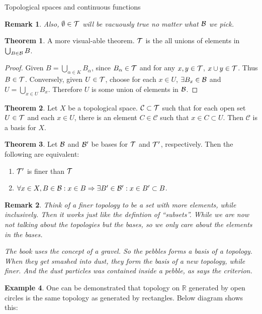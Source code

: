 \documentclass{report}
\newtheorem*{remark}{Remark}
\theoremstyle{definition}
\newtheorem{theorem}{Theorem}[chapter]
\newtheorem{example}[theorem]{Example}
\newcommand{\RA}{\ensuremath\Rightarrow}
\newcommand{\RR}{\mathbb{R}}
\newcommand{\ex}{\ensuremath\exists}
\begin{document}
\begin{chapter}{Topological spaces and continuous functions}
\begin{remark}
    Also, $\emptyset\in\mathcal{T}$ will be vacuously true no matter what $\mathcal{B}$
    we pick.
  \end{remark}
  \begin{theorem}
    A more visual-able theorem. $\mathcal{T}$ is the all unions of elements in
    $\bigcup_{B\in\mathcal{B}} B$.
  \end{theorem}
  \begin{proof}
    Given $B=\bigcup_{\alpha\in K} B_\alpha$, since $B_\alpha\in\mathcal{T}$
    and for any $x,y\in\mathcal{T}$, $x\cup y\in\mathcal{T}$. Thus $B\in\mathcal{T}$. Conversely,
    given $U\in\mathcal{T}$, choose for each $x\in U$, $\ex B_x\in\B$ and
    $U=\bigcup_{x\in U} B_x$. Therefore $U$ is some union of elements
    in $\mathcal{B}$.
  \end{proof}
  \begin{theorem}
    Let $X$ be a topological space. $\mathcal{C}\subset \mathcal{T}$ such that
    for each open set $U\in\mathcal{T}$ and each $x\in U$, there is an element
    $C\in\mathcal{C}$ such that $x\in C\subset U$. Then $\mathcal{C}$
    is a basis for $X$.
  \end{theorem}
  \begin{theorem}
    Let $\mathcal{B}$ and $\mathcal{B}'$ be bases for $\mathcal{T}$ and $\mathcal{T}'$, respectively. Then
    the following are equivalent:
    \begin{enumerate}
    \item $\mathcal{T}'$ is finer than $\mathcal{T}$
    \item
      $\forall x\in X, B\in\B : x\in B \RA \exists B'\in\B' : x\in B'
      \subset B$.
    \end{enumerate}
  \end{theorem}
  \begin{remark}
    Think of a finer topology to be a set with more elements, while
    inclusively. Then it works just like the defintion of
    ``subsets''. While we are now not talking about the topologies but
    the bases, so we only care about the elements in the bases.

    The book uses the concept of a gravel. So the pebbles forms a
    basis of a topology. When they get smashed into dust, they form
    the basis of a new topology, while finer. And the dust particles
    was contained inside a pebble, as says the criterion.
  \end{remark}
  \begin{example}
    One can be demonstrated that topology on $\RR$ generated by open
    circles is the same topology as generated by rectangles. Below
    diagram shows this:

    \begin{figure}[H]
      \centering
\end{figure}
\end{example}
\end{chapter}
\end{document}
